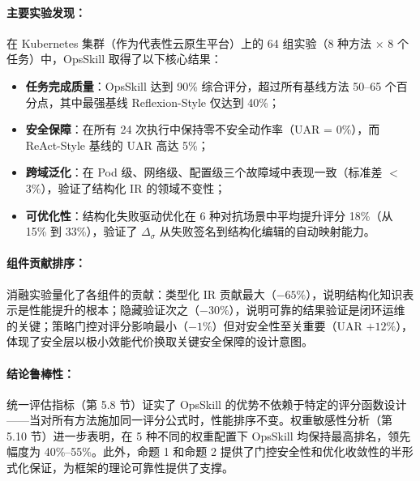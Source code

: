 \documentclass[11pt,a4paper]{ctexart}
\begin{document}
\paragraph{主要实验发现：}
在 Kubernetes 集群（作为代表性云原生平台）上的 64 组实验（8 种方法 $\times$ 8 个任务）中，OpsSkill 取得了以下核心结果：
\begin{itemize}[leftmargin=2em]
  \item \textbf{任务完成质量}：OpsSkill 达到 90\% 综合评分，超过所有基线方法 50--65 个百分点，其中最强基线 Reflexion-Style 仅达到 40\%；
  \item \textbf{安全保障}：在所有 24 次执行中保持零不安全动作率（UAR = 0\%），而 ReAct-Style 基线的 UAR 高达 5\%；
  \item \textbf{跨域泛化}：在 Pod 级、网络级、配置级三个故障域中表现一致（标准差 $<$ 3\%），验证了结构化 IR 的领域不变性；
  \item \textbf{可优化性}：结构化失败驱动优化在 6 种对抗场景中平均提升评分 18\%（从 15\% 到 33\%），验证了 $\Delta_\sigma$ 从失败签名到结构化编辑的自动映射能力。
\end{itemize}

\paragraph{组件贡献排序：}
消融实验量化了各组件的贡献：类型化 IR 贡献最大（$-65\%$），说明结构化知识表示是性能提升的根本；隐藏验证次之（$-30\%$），说明可靠的结果验证是闭环运维的关键；策略门控对评分影响最小（$-1\%$）但对安全性至关重要（UAR $+12\%$），体现了安全层以极小效能代价换取关键安全保障的设计意图。

\paragraph{结论鲁棒性：}
统一评估指标（第 5.8 节）证实了 OpsSkill 的优势不依赖于特定的评分函数设计——当对所有方法施加同一评分公式时，性能排序不变。权重敏感性分析（第 5.10 节）进一步表明，在 5 种不同的权重配置下 OpsSkill 均保持最高排名，领先幅度为 40\%--55\%。此外，命题 1 和命题 2 提供了门控安全性和优化收敛性的半形式化保证，为框架的理论可靠性提供了支撑。
\end{document}
